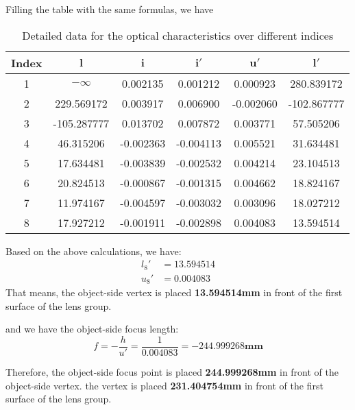 \documentclass{article}
\begin{document}
Filling the table with the same formulas, we have

\begin{table}[H]
    \centering
    \begin{tabular}{cccccc}
        \hline
        \textbf{Index} & $\mathbf{l}$ & $\mathbf{i}$ & $\mathbf{i'}$ & $\mathbf{u'}$ & $\mathbf{l'}$ \\
        \hline
        1              & $-\infty$    & 0.002135     & 0.001212      & 0.000923      & 280.839172    \\
        2              & 229.569172   & 0.003917     & 0.006900      & -0.002060     & -102.867777   \\
        3              & -105.287777  & 0.013702     & 0.007872      & 0.003771      & 57.505206     \\
        4              & 46.315206    & -0.002363    & -0.004113     & 0.005521      & 31.634481     \\
        5              & 17.634481    & -0.003839    & -0.002532     & 0.004214      & 23.104513     \\
        6              & 20.824513    & -0.000867    & -0.001315     & 0.004662      & 18.824167     \\
        7              & 11.974167    & -0.004597    & -0.003032     & 0.003096      & 18.027212     \\
        8              & 17.927212    & -0.001911    & -0.002898     & 0.004083      & 13.594514     \\
        \hline
    \end{tabular}
    \caption{Detailed data for the optical characteristics over different indices}
\end{table}

Based on the above calculations, we have:
\begin{align*}
    l_8' & = 13.594514 \\
    u_8' & = 0.004083
\end{align*}
That means, the object-side vertex is placed \textbf{13.594514mm} in front of the first surface of the lens group.

and we have the object-side focus length:
\begin{equation*}
    \boxed{
        f = -\frac{h}{u'} = \frac{1}{0.004083} =-244.999268\mathbf{mm}
    }
\end{equation*}

Therefore, the object-side focus point is placed \textbf{244.999268mm} in front of the object-side vertex. the vertex is placed \textbf{231.404754mm} in front of the first surface of the lens group.
\end{document}
